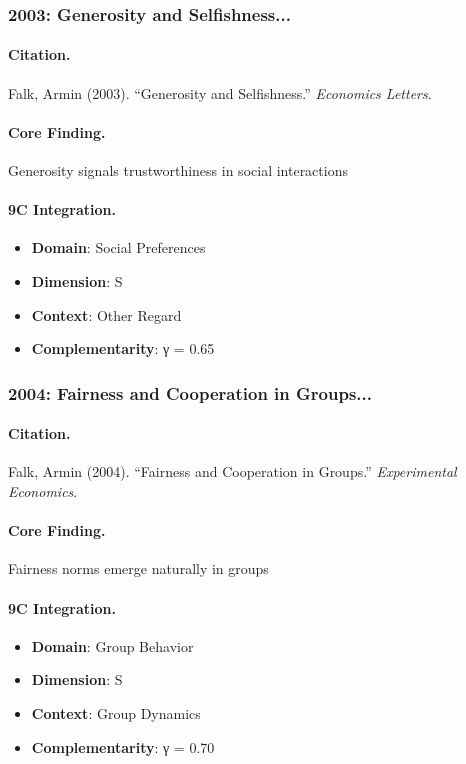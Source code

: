 \subsubsection{2003: Generosity and Selfishness...}

\paragraph{Citation.}
Falk, Armin (2003). ``Generosity and Selfishness.''
\textit{Economics Letters}.

\paragraph{Core Finding.}
Generosity signals trustworthiness in social interactions

\paragraph{9C Integration.}
\begin{itemize}[nosep]
  \item \textbf{Domain}: Social Preferences
  \item \textbf{Dimension}: S
  \item \textbf{Context}: Other Regard
  \item \textbf{Complementarity}: γ = 0.65
\end{itemize}


\subsubsection{2004: Fairness and Cooperation in Groups...}

\paragraph{Citation.}
Falk, Armin (2004). ``Fairness and Cooperation in Groups.''
\textit{Experimental Economics}.

\paragraph{Core Finding.}
Fairness norms emerge naturally in groups

\paragraph{9C Integration.}
\begin{itemize}[nosep]
  \item \textbf{Domain}: Group Behavior
  \item \textbf{Dimension}: S
  \item \textbf{Context}: Group Dynamics
  \item \textbf{Complementarity}: γ = 0.70
\end{itemize}


